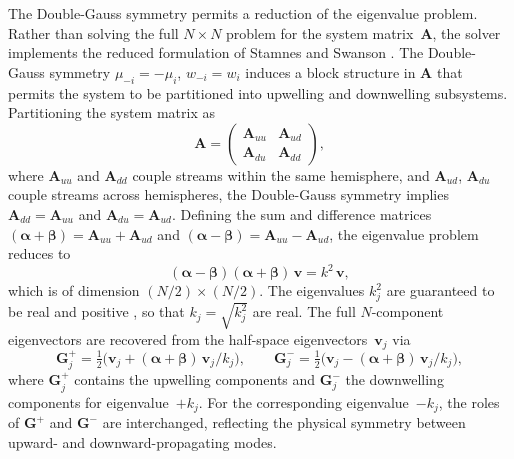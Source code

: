\documentclass[a4paper, 11pt]{article}
\begin{document}
The Double-Gauss symmetry permits a reduction of the eigenvalue
problem.  Rather than solving the full $N \times N$ problem for the
system matrix~$\mathbf{A}$, the solver implements the reduced
formulation of Stamnes and Swanson \cite{stamnes1981}.  The Double-Gauss symmetry
$\mu_{-i} = -\mu_i$, $w_{-i} = w_i$ induces a block structure in
$\mathbf{A}$ that permits the system to be partitioned into upwelling
and downwelling subsystems.  Partitioning the system matrix as
\begin{equation*}
  \mathbf{A} = \begin{pmatrix}
    \mathbf{A}_{uu} & \mathbf{A}_{ud} \\
    \mathbf{A}_{du} & \mathbf{A}_{dd}
  \end{pmatrix},
\end{equation*}
where $\mathbf{A}_{uu}$ and $\mathbf{A}_{dd}$ couple streams within
the same hemisphere, and $\mathbf{A}_{ud}$, $\mathbf{A}_{du}$ couple
streams across hemispheres, the Double-Gauss symmetry implies
$\mathbf{A}_{dd} = \mathbf{A}_{uu}$ and
$\mathbf{A}_{du} = \mathbf{A}_{ud}$.  Defining the sum and difference
matrices
$(\boldsymbol{\alpha} + \boldsymbol{\beta})
= \mathbf{A}_{uu} + \mathbf{A}_{ud}$
and
$(\boldsymbol{\alpha} - \boldsymbol{\beta})
= \mathbf{A}_{uu} - \mathbf{A}_{ud}$,
the eigenvalue problem reduces to
%
\begin{equation}
  (\boldsymbol{\alpha} - \boldsymbol{\beta})
  (\boldsymbol{\alpha} + \boldsymbol{\beta})\,\mathbf{v}
  = k^2\,\mathbf{v},
  \label{eq:reduced_eigen}
\end{equation}
%
which is of dimension $(N/2) \times (N/2)$.  The eigenvalues $k_j^2$
are guaranteed to be real and positive \cite{stamnes1981}, so that
$k_j = \sqrt{k_j^2}$ are real.  The full $N$-component eigenvectors
are recovered from the half-space eigenvectors~$\mathbf{v}_j$ via
%
\begin{equation}
  \mathbf{G}_j^{+} = \tfrac{1}{2}\bigl(\mathbf{v}_j
  + (\boldsymbol{\alpha}+\boldsymbol{\beta})\,\mathbf{v}_j/k_j\bigr),
  \qquad
  \mathbf{G}_j^{-} = \tfrac{1}{2}\bigl(\mathbf{v}_j
  - (\boldsymbol{\alpha}+\boldsymbol{\beta})\,\mathbf{v}_j/k_j\bigr),
  \label{eq:eigvec_recovery}
\end{equation}
%
where $\mathbf{G}_j^{+}$ contains the upwelling components and
$\mathbf{G}_j^{-}$ the downwelling components for eigenvalue~$+k_j$.
For the corresponding eigenvalue~$-k_j$, the roles of $\mathbf{G}^+$
and $\mathbf{G}^-$ are interchanged, reflecting the physical symmetry
between upward- and downward-propagating modes.
\end{document}
